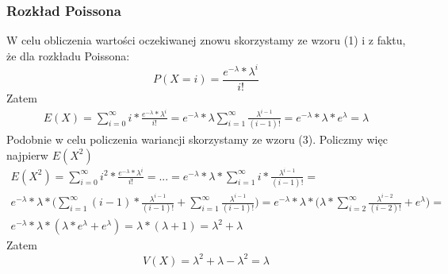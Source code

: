 \documentclass[10pt, a4paper]{article}
\begin{document}
\subsubsection*{Rozkład Poissona}
W celu obliczenia wartości oczekiwanej znowu skorzystamy ze wzoru (1) i z faktu, że dla rozkładu Poissona:
\begin{equation}
P(X=i) = \frac{e^{-\lambda} * \lambda ^ i}{i!}
\end{equation}
Zatem
\begin{align*}
E(X) = \sum_{i=0}^{\infty} i * \frac{e^{-\lambda} * \lambda ^ i}{i!} = e^{-\lambda} * \lambda \sum_{i=1}^{\infty} \frac{\lambda ^ {i-1}}{(i-1)!} = e^{-\lambda} * \lambda * e^{\lambda} = \lambda
\end{align*}
Podobnie w celu policzenia wariancji skorzystamy ze wzoru (3). Policzmy więc najpierw $E(X^2)$
\begin{align*}
E(X^2) = \sum_{i=0}^{\infty} i^2 * \frac{e^{-\lambda} * \lambda ^ i}{i!} = ... = e^{-\lambda} * \lambda * \sum_{i=1}^{\infty} i * \frac{\lambda ^ {i-1}}{(i-1)!} = \\ e^{-\lambda} * \lambda * \Big( \sum_{i=1}^{\infty} (i - 1) * \frac{\lambda ^ {i-1}}{(i-1)!} + \sum_{i=1}^{\infty} \frac{\lambda ^ {i-1}}{(i-1)!} \Big) = e^{-\lambda} * \lambda * \Big( \lambda * \sum_{i=2}^{\infty} \frac{\lambda ^ {i-2}}{(i-2)!} + e^{\lambda} \Big) = \\  e^{-\lambda} * \lambda * (\lambda * e^{\lambda} + e^{\lambda}) = \lambda * (\lambda + 1) = \lambda^2 + \lambda
\end{align*}
Zatem 
\begin{equation}
V(X) = \lambda^2 + \lambda - \lambda^2 = \lambda
\end{equation}
\end{document}

